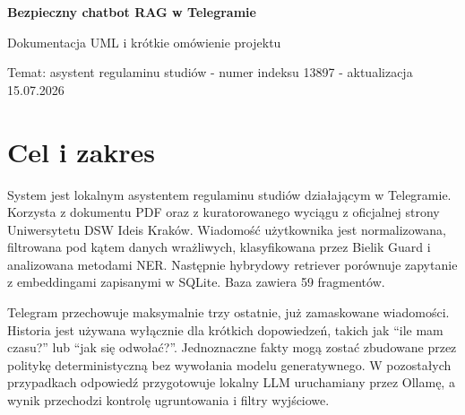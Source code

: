 \documentclass[10pt,a4paper]{article}
\begin{document}
\begin{center}
  {\color{navy}\sffamily\bfseries\LARGE Bezpieczny chatbot RAG w Telegramie}\par
  \vspace{2mm}
  {\large Dokumentacja UML i krótkie omówienie projektu}\par
  \vspace{1mm}
  {\small Temat: asystent regulaminu studiów - numer indeksu 13897 - aktualizacja 15.07.2026}
\end{center}

\vspace{2mm}
\section*{Cel i zakres}

System jest lokalnym asystentem regulaminu studiów działającym w Telegramie. Korzysta z
dokumentu PDF oraz z kuratorowanego wyciągu z oficjalnej strony Uniwersytetu DSW Ideis
Kraków. Wiadomość użytkownika jest normalizowana, filtrowana pod kątem danych wrażliwych,
klasyfikowana przez Bielik Guard i analizowana metodami NER. Następnie hybrydowy retriever
porównuje zapytanie z embeddingami zapisanymi w SQLite. Baza zawiera 59 fragmentów.

Telegram przechowuje maksymalnie trzy ostatnie, już zamaskowane wiadomości. Historia jest
używana wyłącznie dla krótkich dopowiedzeń, takich jak ``ile mam czasu?'' lub ``jak się
odwołać?''. Jednoznaczne fakty mogą zostać zbudowane przez politykę deterministyczną bez
wywołania modelu generatywnego. W pozostałych przypadkach odpowiedź przygotowuje lokalny LLM
uruchamiany przez Ollamę, a wynik przechodzi kontrolę ugruntowania i filtry wyjściowe.

\begin{center}
\end{center}
\end{document}
